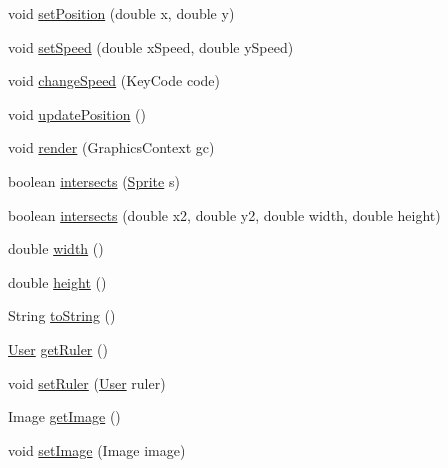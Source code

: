 \begin{DoxyCompactItemize}
\item 
void \hyperlink{classfr_1_1projet_1_1groupe40_1_1model_1_1_sprite_a9e5a351531357c8f3d7db969928492ff}{set\+Position} (double x, double y)
\item 
void \hyperlink{classfr_1_1projet_1_1groupe40_1_1model_1_1_sprite_a493d99ca3af3f1aadaafde3b49d5f76d}{set\+Speed} (double x\+Speed, double y\+Speed)
\item 
void \hyperlink{classfr_1_1projet_1_1groupe40_1_1model_1_1_sprite_a7b8ad140aa45dd17cd1158ed0bb17b41}{change\+Speed} (Key\+Code code)
\item 
void \hyperlink{classfr_1_1projet_1_1groupe40_1_1model_1_1_sprite_ac176a01b5cd31b44625b986ac6465dc4}{update\+Position} ()
\item 
void \hyperlink{classfr_1_1projet_1_1groupe40_1_1model_1_1_sprite_a49192f4485bd8773e30f8f6001da846c}{render} (Graphics\+Context gc)
\item 
boolean \hyperlink{classfr_1_1projet_1_1groupe40_1_1model_1_1_sprite_ac7b36b21ecd726d53df5b55c176d14c0}{intersects} (\hyperlink{classfr_1_1projet_1_1groupe40_1_1model_1_1_sprite}{Sprite} s)
\item 
boolean \hyperlink{classfr_1_1projet_1_1groupe40_1_1model_1_1_sprite_a8388dcfa156e3311768dc8cdee554989}{intersects} (double x2, double y2, double width, double height)
\item 
double \hyperlink{classfr_1_1projet_1_1groupe40_1_1model_1_1_sprite_ac9816a7404c674b2cb1d0fa2d1d57c16}{width} ()
\item 
double \hyperlink{classfr_1_1projet_1_1groupe40_1_1model_1_1_sprite_afc96a634b1c8e707fc0270d1f2bbdaf7}{height} ()
\item 
String \hyperlink{classfr_1_1projet_1_1groupe40_1_1model_1_1_sprite_aefa1e974157818c675f3a2a09c2a2c0c}{to\+String} ()
\item 
\hyperlink{classfr_1_1projet_1_1groupe40_1_1client_1_1_user}{User} \hyperlink{classfr_1_1projet_1_1groupe40_1_1model_1_1_sprite_adb3cc8fe7587257ec1ba0d1b11aab358}{get\+Ruler} ()
\item 
void \hyperlink{classfr_1_1projet_1_1groupe40_1_1model_1_1_sprite_aa1e2d8bbd9276ff283ffe17236fe0424}{set\+Ruler} (\hyperlink{classfr_1_1projet_1_1groupe40_1_1client_1_1_user}{User} ruler)
\item 
Image \hyperlink{classfr_1_1projet_1_1groupe40_1_1model_1_1_sprite_accf8ab35b3fe0645d7c70aa47d6ad599}{get\+Image} ()
\item 
void \hyperlink{classfr_1_1projet_1_1groupe40_1_1model_1_1_sprite_a63ee7ba27752eca98bdc4811f5c0cb29}{set\+Image} (Image image)

\end{DoxyCompactItemize}
